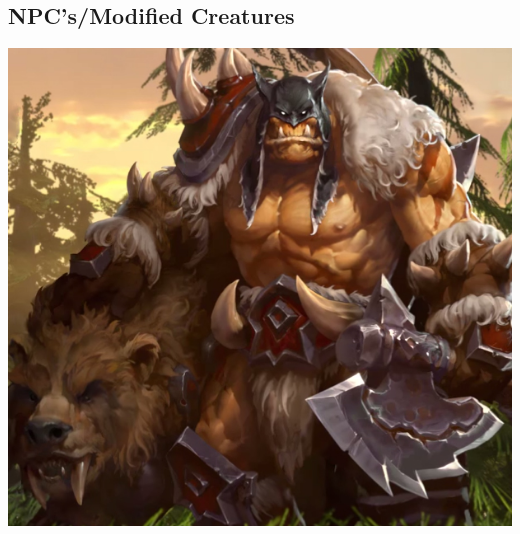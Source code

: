 \documentclass[letterpaper,10pt,twoside,twocolumn,openany]{book}
\begin{document}
\subsection{NPC's/Modified Creatures}

\begin{center}
	\includegraphics[width=\linewidth]{img/RexxarArt.jpg}
\end{center}
\end{document}
